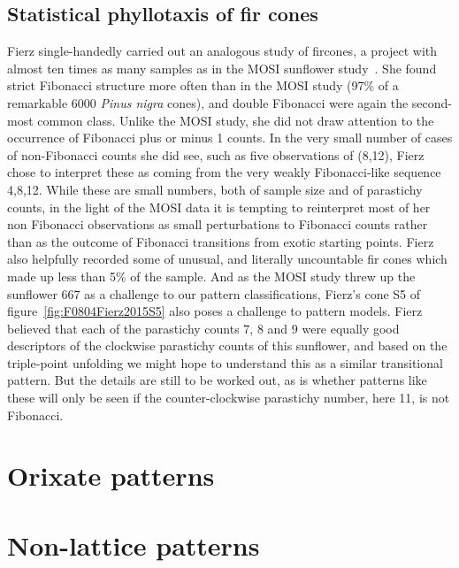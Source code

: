 \subsection{Statistical phyllotaxis of fir cones}

Fierz single-handedly carried out an analogous study of fircones, a  project with almost ten times as many samples as in the MOSI sunflower study~\autocite{fierzAberrantPhyllotacticPatterns2015}. She found strict Fibonacci structure more often than in the MOSI study (97\% of a remarkable 6000 \textit{Pinus nigra} cones), and double Fibonacci were again the second-most common class. Unlike the MOSI study, she did not draw attention to the occurrence of Fibonacci plus or minus 1 counts. In the very small number of cases of non-Fibonacci counts she did see, such as five  observations of (8,12),  Fierz chose to interpret these as coming from the very weakly Fibonacci-like sequence 4,8,12. While these are small numbers, both of sample size and of parastichy counts, in the light of the MOSI data  it is tempting to reinterpret most of her non Fibonacci observations as small perturbations to Fibonacci counts rather than as the outcome of Fibonacci transitions from exotic starting points. Fierz also helpfully recorded some of unusual, and literally uncountable fir cones which made up less than 5\% of the sample.  And as the MOSI study threw up the sunflower 667 as a challenge to our pattern classifications, 
Fierz's cone S5 of figure~\ref{fig:F0804Fierz2015S5} also poses a challenge to pattern models. Fierz believed that each of the parastichy counts 7, 8 and 9 were equally good descriptors of the clockwise parastichy counts of this sunflower, and based on the triple-point unfolding we might hope to understand this as a similar transitional pattern. But the details are still to be worked out, as is whether patterns like these will only be seen if the counter-clockwise parastichy number, here 11, is not Fibonacci.

\section{Orixate patterns}
\section{Non-lattice patterns}

